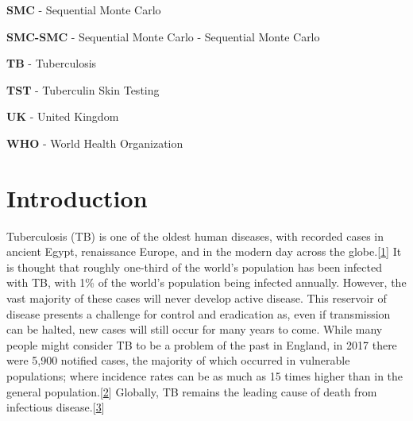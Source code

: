 \documentclass[11pt,twoside]{bristolthesis}
\begin{document}
\begin{acronyms}
      \par
      
      \textbf{SMC} - Sequential Monte Carlo
      
      \par
      
      \textbf{SMC-SMC} - Sequential Monte Carlo - Sequential Monte Carlo
      
      \par
      
      \textbf{TB} - Tuberculosis
      
      \par
      
      \textbf{TST} - Tuberculin Skin Testing
      
      \par
      
      \textbf{UK} - United Kingdom
      
      \par
      
      \textbf{WHO} - World Health Organization
      
      \par
    \end{acronyms}
  \mainmatter %
  \pagestyle{fancyplain} %

  \hypertarget{introduction}{%
  \chapter{Introduction}\label{introduction}}
  
  Tuberculosis (TB) is one of the oldest human diseases, with recorded cases in ancient Egypt, renaissance Europe, and in the modern day across the globe.{[}\protect\hyperlink{ref-Stone2009}{1}{]} It is thought that roughly one-third of the world's population has been infected with TB, with 1\% of the world's population being infected annually. However, the vast majority of these cases will never develop active disease. This reservoir of disease presents a challenge for control and eradication as, even if transmission can be halted, new cases will still occur for many years to come. While many people might consider TB to be a problem of the past in England, in 2017 there were 5,900 notified cases, the majority of which occurred in vulnerable populations; where incidence rates can be as much as 15 times higher than in the general population.{[}\protect\hyperlink{ref-PHE2017}{2}{]} Globally, TB remains the leading cause of death from infectious disease.{[}\protect\hyperlink{ref-TheWorldHealthOrganization:2018va}{3}{]}
  
\end{document}
